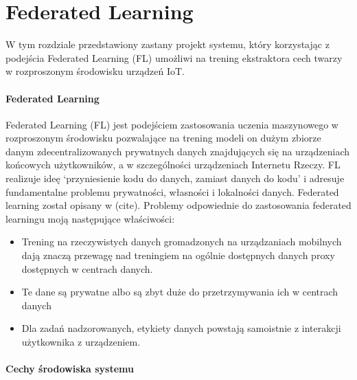\newpage
\section[federated]{Federated Learning}\label{sec:federated}

W tym rozdziale przedstawiony zastany projekt systemu, który korzystając z podejścia Federated  Learning (FL) umożliwi na trening ekstraktora cech twarzy w rozproszonym środowisku urządzeń IoT.


\paragraph{Federated Learning}

Federated Learning (FL) jest podejściem zastosowania uczenia maszynowego w rozproszonym
środowisku pozwalające na trening modeli on dużym zbiorze danym zdecentralizowanych prywatnych
danych znajdujących się na urządzeniach końcowych użytkowników, a w szczególności urządzeniach
Internetu Rzeczy. FL realizuje ideę `przyniesienie kodu do danych, zamiast danych do kodu' i
adresuje fundamentalne problemu prywatności, własności i lokalności danych. Federated learning
został opisany w (cite).
Problemy odpowiednie do zastosowania federated learningu moją następujące właściwości:
\begin{itemize}
  \item Trening na rzeczywistych danych gromadzonych na urządzaniach mobilnych dają znaczą przewagę
  nad treningiem na ogólnie dostępnych danych proxy dostępnych w centrach danych.
  \item Te dane są prywatne albo są zbyt duże do przetrzymywania ich w centrach danych
  \item Dla zadań nadzorowanych, etykiety danych powstają samoistnie z interakcji użytkownika z urządzeniem.
\end{itemize}

\paragraph{Cechy środowiska systemu}


